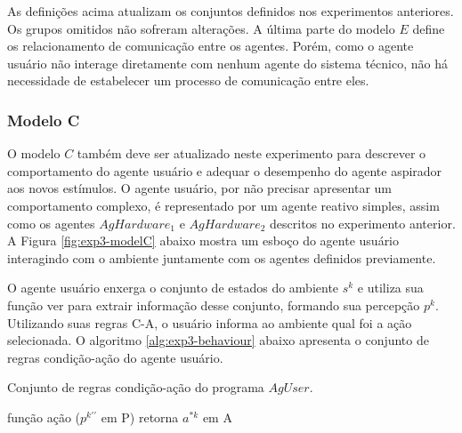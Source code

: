 As definições acima atualizam os conjuntos definidos nos experimentos anteriores. Os grupos omitidos não sofreram alterações. A última parte do modelo $E$ define os relacionamento de comunicação entre os agentes. Porém, como o agente usuário não interage diretamente com nenhum agente do sistema técnico, não há necessidade de estabelecer um processo de comunicação entre eles. 

\subsubsection{Modelo C}

O modelo $C$ também deve ser atualizado neste experimento para descrever o comportamento do agente usuário e adequar o desempenho do agente aspirador aos novos estímulos. O agente usuário, por não precisar apresentar um comportamento complexo, é representado por um agente reativo simples, assim como os agentes $AgHardware_1$ e $AgHardware_2$ descritos no experimento anterior. A Figura \ref{fig:exp3-modelC} abaixo mostra um esboço do agente usuário interagindo com o ambiente juntamente com os agentes definidos previamente.

\begin{figure}[h!]
    \centering
\end{figure}

O agente usuário enxerga o conjunto de estados do ambiente $s^k$ e utiliza sua função ver para extrair informação desse conjunto, formando sua percepção $p^k$. Utilizando suas regras C-A, o usuário informa ao ambiente qual foi a ação selecionada. O algoritmo \ref{alg:exp3-behaviour} abaixo apresenta o conjunto de regras condição-ação do agente usuário. 

\begin{algorithm}[h!]
    \caption{\label{alg:exp3-behaviour} Conjunto de regras condição-ação do programa $AgUser$.}
    função ação ($p^{k\prime\prime}$ em P) retorna $a^{*k}$ em A\\
\end{algorithm}

